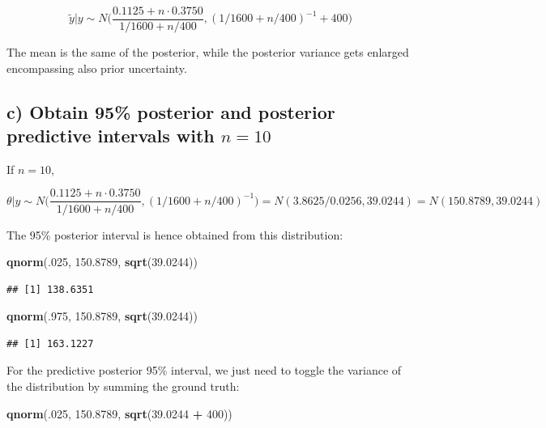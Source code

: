 \documentclass[]{article}
\newenvironment{Shaded}{\begin{snugshade}}{\end{snugshade}}
\newcommand{\KeywordTok}[1]{\textcolor[rgb]{0.13,0.29,0.53}{\textbf{#1}}}
\newcommand{\DecValTok}[1]{\textcolor[rgb]{0.00,0.00,0.81}{#1}}
\newcommand{\FloatTok}[1]{\textcolor[rgb]{0.00,0.00,0.81}{#1}}
\newcommand{\StringTok}[1]{\textcolor[rgb]{0.31,0.60,0.02}{#1}}
\newcommand{\OperatorTok}[1]{\textcolor[rgb]{0.81,0.36,0.00}{\textbf{#1}}}
\newcommand{\NormalTok}[1]{#1}
\begin{document}
\[
\tilde{y}|y \sim N\bigg(\frac{0.1125+n\cdot0.3750}{1/1600+n/400}, (1/1600+n/400)^{-1} + 400\bigg)
\]

The mean is the same of the posterior, while the posterior variance gets
enlarged encompassing also prior uncertainty.

\subsection{\texorpdfstring{c) Obtain 95\% posterior and posterior
predictive intervals with
\(n=10\)}{c) Obtain 95\% posterior and posterior predictive intervals with n=10}}\label{c-obtain-95-posterior-and-posterior-predictive-intervals-with-n10}

If \(n=10\),

\[
\theta|y \sim N\bigg( \frac{0.1125+n \cdot 0.3750}{1/1600+n/400}, (1/1600+n/400)^{-1} \bigg) = N(3.8625/0.0256, 39.0244) = N(150.8789, 39.0244)
\]

The 95\% posterior interval is hence obtained from this distribution:

\begin{Shaded}
\begin{Highlighting}[]
\KeywordTok{qnorm}\NormalTok{(.}\DecValTok{025}\NormalTok{, }\FloatTok{150.8789}\NormalTok{, }\KeywordTok{sqrt}\NormalTok{(}\FloatTok{39.0244}\NormalTok{))}
\end{Highlighting}
\end{Shaded}

\begin{verbatim}
## [1] 138.6351
\end{verbatim}

\begin{Shaded}
\begin{Highlighting}[]
\KeywordTok{qnorm}\NormalTok{(.}\DecValTok{975}\NormalTok{, }\FloatTok{150.8789}\NormalTok{, }\KeywordTok{sqrt}\NormalTok{(}\FloatTok{39.0244}\NormalTok{))}
\end{Highlighting}
\end{Shaded}

\begin{verbatim}
## [1] 163.1227
\end{verbatim}

For the predictive posterior 95\% interval, we just need to toggle the
variance of the distribution by summing the ground truth:

\begin{Shaded}
\begin{Highlighting}[]
\KeywordTok{qnorm}\NormalTok{(.}\DecValTok{025}\NormalTok{, }\FloatTok{150.8789}\NormalTok{, }\KeywordTok{sqrt}\NormalTok{(}\FloatTok{39.0244} \OperatorTok{+}\StringTok{ }\DecValTok{400}\NormalTok{))}
\end{Highlighting}
\end{Shaded}
\end{document}
